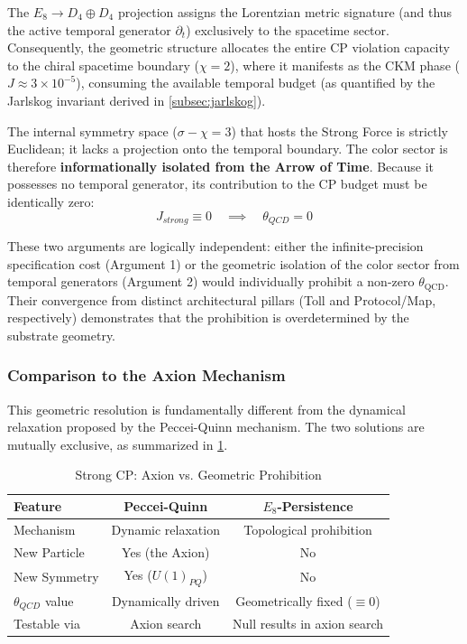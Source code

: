 The $E_8 \to D_4 \oplus D_4$ projection assigns the Lorentzian metric signature (and thus the active temporal generator $\partial_t$) exclusively to the spacetime sector. Consequently, the geometric structure allocates the entire CP violation capacity to the chiral spacetime boundary ($\chi=2$), where it manifests as the CKM phase ($J \approx 3 \times 10^{-5}$), consuming the available temporal budget (as quantified by the Jarlskog invariant derived in \cref{subsec:jarlskog}).

The internal symmetry space ($\sigma-\chi=3$) that hosts the Strong Force is strictly Euclidean; it lacks a projection onto the temporal boundary. The color sector is therefore \textbf{informationally isolated from the Arrow of Time}. Because it possesses no temporal generator, its contribution to the CP budget must be identically zero:
\begin{equation}
    J_{strong} \equiv 0 \quad \implies \quad \theta_{QCD} = 0
\end{equation}

These two arguments are logically independent: either the infinite-precision specification cost (Argument 1) or the geometric isolation of the color sector from temporal generators (Argument 2) would individually prohibit a non-zero $\theta_{\mathrm{QCD}}$. Their convergence from distinct architectural pillars (Toll and Protocol/Map, respectively) demonstrates that the prohibition is overdetermined by the substrate geometry.

\subsubsection{Comparison to the Axion Mechanism}
This geometric resolution is fundamentally different from the dynamical relaxation proposed by the Peccei-Quinn mechanism. The two solutions are mutually exclusive, as summarized in \cref{tab:cp_solutions}.

\begin{table}[htbp]
\centering
\caption{Strong CP: Axion vs. Geometric Prohibition}
\begin{tabular}{@{}lcc@{}}
\toprule
\textbf{Feature} & \textbf{Peccei-Quinn} & \textbf{$E_8$-Persistence} \\
\midrule
Mechanism & Dynamic relaxation & Topological prohibition \\
New Particle & Yes (the Axion) & No \\
New Symmetry & Yes ($U(1)_{PQ}$) & No \\
$\theta_{QCD}$ value & Dynamically driven & Geometrically fixed ($\equiv 0$) \\
Testable via & Axion search & Null results in axion search \\
\bottomrule
\end{tabular}
\label{tab:cp_solutions}
\end{table}

